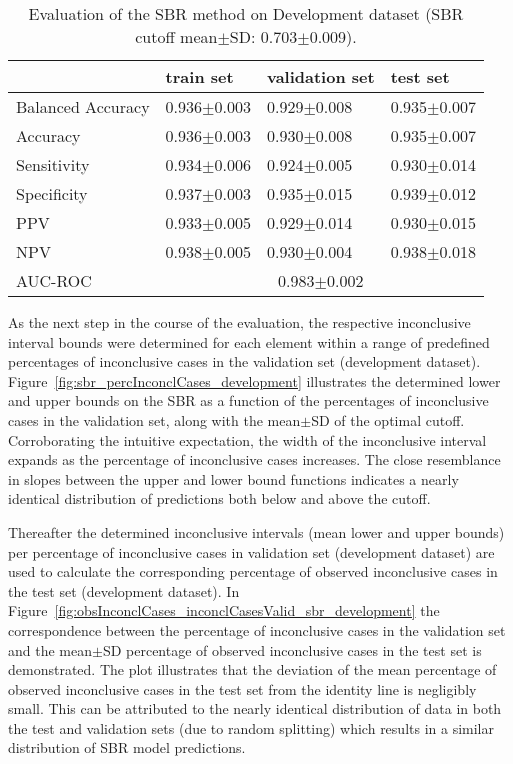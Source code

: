 \begin{table}[ht]
  \caption{Evaluation of the SBR method on Development dataset (SBR cutoff mean$\pm$SD: 0.703$\pm$0.009).}
  \centering
  \begin{tabular}{llll}
      \hline
                        & train set         & validation set      & test set             \\
      \hline
      Balanced Accuracy & 0.936$\pm$0.003   &   0.929$\pm$0.008   &  0.935$\pm$0.007     \\
      Accuracy          & 0.936$\pm$0.003   &   0.930$\pm$0.008   &  0.935$\pm$0.007     \\
      Sensitivity       &  0.934$\pm$0.006  &   0.924$\pm$0.005   &  0.930$\pm$0.014     \\
      Specificity       & 0.937$\pm$0.003   &   0.935$\pm$0.015   &  0.939$\pm$0.012     \\
      PPV               &  0.933$\pm$0.005  &   0.929$\pm$0.014   &  0.930$\pm$0.015     \\
      NPV               &  0.938$\pm$0.005  &   0.930$\pm$0.004   &  0.938$\pm$0.018     \\
      \hline
      AUC-ROC          &  \multicolumn{3}{c}{0.983$\pm$0.002 }  \\
      \hline
  \end{tabular}
 \label{t1:sbr_perf_eval_table}
\end{table}


As the next step in the course of the evaluation, 
the respective inconclusive interval bounds were determined 
for each element within a range of predefined percentages of inconclusive cases 
in the validation set (development dataset).
Figure~\ref{fig:sbr_percInconclCases_development} illustrates the determined lower and upper bounds on the SBR 
as a function of the percentages of inconclusive cases in the validation set, 
along with the mean$\pm$SD of the optimal cutoff.
Corroborating the intuitive expectation, the width of the inconclusive interval expands 
as the percentage of inconclusive cases increases.
The close resemblance in slopes between the upper and lower bound functions 
indicates a nearly identical distribution of predictions both below and above the cutoff.

Thereafter the determined inconclusive intervals (mean lower and upper bounds) per percentage of inconclusive cases 
in validation set (development dataset)
are used to calculate the corresponding percentage of observed inconclusive cases in the test set (development dataset).
In Figure~\ref{fig:obsInconclCases_inconclCasesValid_sbr_development} the correspondence between 
the percentage of inconclusive cases in the validation set and 
the mean$\pm$SD percentage of observed inconclusive cases in the test set is demonstrated.
The plot illustrates that the deviation of the mean percentage of observed inconclusive cases in the test set from the 
identity line is negligibly small.
This can be attributed to the nearly identical distribution of data in both the test and validation sets 
(due to random splitting) which results in a similar distribution of SBR model predictions.


